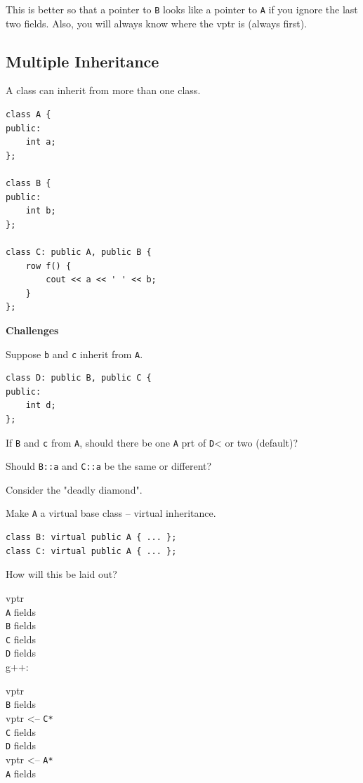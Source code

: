 \documentclass[11pt]{article}
\theoremstyle{definition}
\begin{document}
This is better so that a pointer to {\tt B} looks like a pointer to {\tt A} if you ignore the last two fields. Also, you will always know where the vptr is (always first).

\subsection{Multiple Inheritance}
A class can inherit from more than one class.
\begin{lstlisting}
class A {
public:
    int a;
};

class B {
public:
    int b;
};

class C: public A, public B {
    row f() {
        cout << a << ' ' << b;
    }
};
\end{lstlisting}\vspace{-1.5ex}
{\bf Challenges}

Suppose {\tt b} and {\tt c} inherit from {\tt A}.
\begin{lstlisting}
class D: public B, public C {
public:
    int d;
};
\end{lstlisting}\vspace{-1.5ex}
If {\tt B} and {\tt c} from {\tt A}, should there be one {\tt A} prt of {\tt D}< or two (default)?

Should {\tt B::a} and {\tt C::a} be the same or different?

Consider the "deadly diamond".

Make {\tt A} a virtual base class -- virtual inheritance.
\begin{lstlisting}
class B: virtual public A { ... };
class C: virtual public A { ... };
\end{lstlisting}\vspace{-1.5ex}
How will this be laid out?

vptr\\
{\tt A} fields\\
{\tt B} fields\\
{\tt C} fields\\
{\tt D} fields\\

g++: 

vptr\\
{\tt B} fields\\
vptr <-- {\tt C*}\\
{\tt C} fields\\
{\tt D} fields\\
vptr <-- {\tt A*}\\
{\tt A} fields
\end{document}
